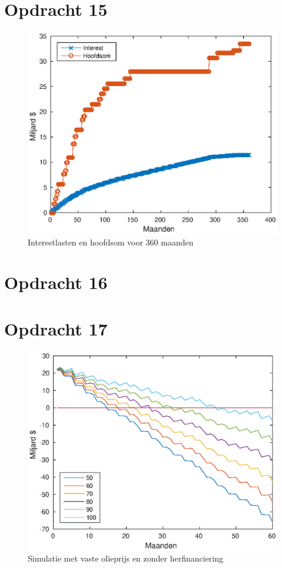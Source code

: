 \documentclass[11pt,a4paper]{article}
\begin{document}
\section*{Opdracht 15}
\begin{figure}[H]
\centering
\includegraphics[scale=0.75]{opdracht15}
\caption{Interestlasten en hoofdsom voor 360 maanden}
\end{figure}


\section*{Opdracht 16}



\section*{Opdracht 17}
\begin{figure}[H]
\centering
\includegraphics[scale=0.75]{opdracht17}
\caption{Simulatie met vaste olieprijs en zonder herfinanciering}
\end{figure}
\end{document}
